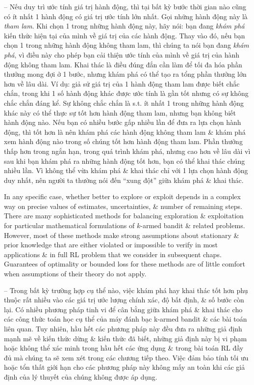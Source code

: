 \documentclass{article}
\begin{document}
\begin{itemize}
\begin{itemize}
        -- Nếu duy trì ước tính giá trị hành động, thì tại bất kỳ bước thời gian nào cũng có ít nhất 1 hành động có giá trị ước tính lớn nhất. Gọi những hành động này là {\it tham lam}. Khi chọn 1 trong những hành động này, hãy nói: bạn đang {\it khám phá} kiến thức hiện tại của mình về giá trị của các hành động. Thay vào đó, nếu bạn chọn 1 trong những hành động không tham lam, thì chúng ta nói bạn đang {\it khám phá}, vì điều này cho phép bạn cải thiện ước tính của mình về giá trị của hành động không tham lam. Khai thác là điều đúng đắn cần làm để tối đa hóa phần thưởng mong đợi ở 1 bước, nhưng khám phá có thể tạo ra tổng phần thưởng lớn hơn về lâu dài. Ví dụ: giả sử giá trị của 1 hành động tham lam được biết chắc chắn, trong khi 1 số hành động khác được ước tính là gần tốt nhưng có sự không chắc chắn đáng kể. Sự không chắc chắn là s.t. ít nhất 1 trong những hành động khác này có thể thực sự tốt hơn hành động tham lam, nhưng bạn không biết hành động nào. Nếu bạn có nhiều bước gấp nhiều lần để đưa ra lựa chọn hành động, thì tốt hơn là nên khám phá các hành động không tham lam \& khám phá xem hành động nào trong số chúng tốt hơn hành động tham lam. Phần thưởng thấp hơn trong ngắn hạn, trong quá trình khám phá, nhưng cao hơn về lâu dài vì sau khi bạn khám phá ra những hành động tốt hơn, bạn có thể khai thác chúng nhiều lần. Vì không thể vừa khám phá \& khai thác chỉ với 1 lựa chọn hành động duy nhất, nên người ta thường nói đến ``xung đột'' giữa khám phá \& khai thác.

        In any specific case, whether better to explore or exploit depends in a complex way on precise values of estimates, uncertainties, \& number of remaining steps. There are many sophisticated methods for balancing exploration \& exploitation for particular mathematical formulations of $k$-armed bandit \& related problems. However, most of these methods make strong assumptions about stationary \& prior knowledge that are either violated or impossible to verify in most applications \& in full RL problem that we consider in subsequent chaps. Guarantees of optimality or bounded loss for these methods are of little comfort when assumptions of their theory do not apply.

        -- Trong bất kỳ trường hợp cụ thể nào, việc khám phá hay khai thác tốt hơn phụ thuộc rất nhiều vào các giá trị ước lượng chính xác, độ bất định, \& số bước còn lại. Có nhiều phương pháp tinh vi để cân bằng giữa khám phá \& khai thác cho các công thức toán học cụ thể của máy đánh bạc k-armed bandit \& các bài toán liên quan. Tuy nhiên, hầu hết các phương pháp này đều đưa ra những giả định mạnh mẽ về kiến thức dừng \& kiến thức đã biết, những giả định này bị vi phạm hoặc không thể xác minh trong hầu hết các ứng dụng \& trong bài toán RL đầy đủ mà chúng ta sẽ xem xét trong các chương tiếp theo. Việc đảm bảo tính tối ưu hoặc tổn thất giới hạn cho các phương pháp này không mấy an toàn khi các giả định của lý thuyết của chúng không được áp dụng.


\end{itemize}
\end{itemize}
\end{document}
